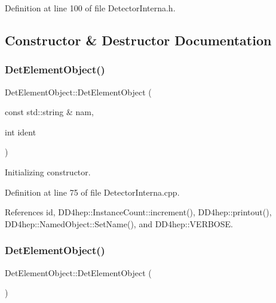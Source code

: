 Definition at line 100 of file Detector\+Interna.\+h.



\subsection{Constructor \& Destructor Documentation}
\hypertarget{class_d_d4hep_1_1_geometry_1_1_det_element_object_a2001d9608badcd67be58cdf9e8092ee8}{}\label{class_d_d4hep_1_1_geometry_1_1_det_element_object_a2001d9608badcd67be58cdf9e8092ee8} 
\subsubsection{\texorpdfstring{Det\+Element\+Object()}{DetElementObject()}\hspace{0.1cm}{\footnotesize\ttfamily [1/2]}}
{\footnotesize\ttfamily Det\+Element\+Object\+::\+Det\+Element\+Object (\begin{DoxyParamCaption}\item[{const std\+::string \&}]{nam,  }\item[{int}]{ident }\end{DoxyParamCaption})}



Initializing constructor. 



Definition at line 75 of file Detector\+Interna.\+cpp.



References id, D\+D4hep\+::\+Instance\+Count\+::increment(), D\+D4hep\+::printout(), D\+D4hep\+::\+Named\+Object\+::\+Set\+Name(), and D\+D4hep\+::\+V\+E\+R\+B\+O\+SE.

\hypertarget{class_d_d4hep_1_1_geometry_1_1_det_element_object_ab96898101ad9db1eb508106a0b6bd6ab}{}\label{class_d_d4hep_1_1_geometry_1_1_det_element_object_ab96898101ad9db1eb508106a0b6bd6ab} 
\subsubsection{\texorpdfstring{Det\+Element\+Object()}{DetElementObject()}\hspace{0.1cm}{\footnotesize\ttfamily [2/2]}}
{\footnotesize\ttfamily Det\+Element\+Object\+::\+Det\+Element\+Object (\begin{DoxyParamCaption}{ }\end{DoxyParamCaption})}



